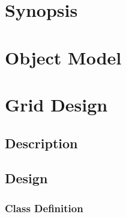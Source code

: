 \documentclass[]{article}
\begin{document}




\newpage
\tableofcontents

\newpage


\section{Synopsis}





%


\section{Object Model}




% 
% 

\section{Grid Design}

\subsection{Description}




\subsection{Design}




\subsubsection{Class Definition}


\end{document}
